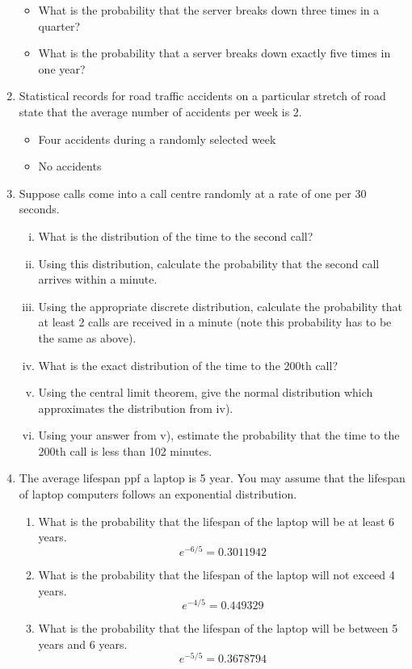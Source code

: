 \documentclass[]{report}
\begin{document}
\begin{enumerate}
\begin{itemize}
\item What is the probability that the server breaks down three times in a quarter?
\item What is the probability that a server breaks down exactly five times in one year?
\end{itemize}

\item 
Statistical records for road traffic accidents on a particular stretch of road state that the average number of accidents per week is 2.

\begin{itemize}
\item Four accidents during a randomly selected week
\item No accidents
\end{itemize}

\item  Suppose calls come into a call centre randomly at a rate of one per 30 seconds.
\begin{enumerate}[(i)]
\item What is the distribution of the time to the second call?
\item Using this distribution, calculate the probability that the second call arrives within a minute. 
\item Using the appropriate discrete distribution, calculate the probability that at least 2 calls are received in a minute (note this probability has to be the same as above).
\item What is the exact distribution of the time to the 200th call?
\item Using the central limit theorem, give the normal distribution which approximates the distribution from iv).
\item Using your answer from v), estimate the probability that the time to the 200th call is less than 102 minutes.
\end{enumerate}

\item The average lifespan ppf a laptop is 5 year. You may assume that the lifespan of laptop computers follows an exponential distribution.

\begin{enumerate}
\item What is the probability that the lifespan of the laptop will be at least 6 years.
\[e^{-6/5} = 0.3011942\]
\item What is the probability that the lifespan of the laptop will not exceed 4 years.
\[e^{-4/5} = 0.449329\]
\item What is the probability that the lifespan of the laptop will be between 5 years and 6 years.
\[e^{-5/5} = 0.3678794\]
\end{enumerate}


\end{enumerate}
\end{document}
